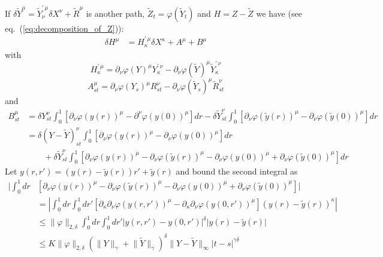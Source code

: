 \documentclass[a4paper,12pt,reqno]{amsproc}
\newcommand{\der}{\delta\!}
\newcommand{\norm}[1]{\lVert #1\rVert}
\newcommand{\abs}[1]{\lvert #1\rvert}
\newcommand{\Abs}[1]{\left\lvert #1\right\rvert}
\begin{document}
If $\der\widetilde Y^\mu =  \widetilde Y^{\prime\,\mu}_{\nu}  \der X^\nu
+ \widetilde  R^\mu$ is another path, $\widetilde Z_t =
\varphi(\widetilde Y_t)$ and $H = Z -\widetilde Z$ we have (see
eq.~(\ref{eq:decomposition_of_Z})):
\begin{equation}
\label{eq:difference_H}
  \begin{split}
\der H^\mu &  = H^{\prime\,\mu}_{\kappa} \der X^\kappa + A^\mu + B^\mu
  \end{split}
\end{equation}
with 
$$
H^{\prime\,\mu}_{\kappa} = \partial_\nu \varphi(Y)^\mu
Y^{\prime\,\nu}_{\kappa}-\partial_\nu \varphi(\widetilde Y)^\mu \widetilde Y^{\prime\,\nu}_{\kappa}
$$
$$
A^{\mu}_{st} = \partial_\nu\varphi(Y_s)^\mu R^\nu_{st} -
\partial_\nu\varphi(\widetilde  Y_s)^\mu \widetilde  R^\nu_{st}
$$
and
\begin{equation*}
  \begin{split}
B^{\mu}_{st} & =
 \der Y^\nu_{st} \int_0^1 \left[\partial_\nu
  \varphi(y(r))^\mu-\partial^\nu \varphi(y(0))^\mu\right] dr -
\der \widetilde Y^\nu_{st} \int_0^1 \left[\partial_\nu
  \varphi(\widetilde y(r))^\mu-\partial_\nu \varphi(\widetilde
  y(0))^\mu\right] dr 
\\ & = \der (Y-\widetilde Y)^\nu_{st} \int_0^1 \left[\partial_\nu
  \varphi(y(r))^\mu-\partial_\nu \varphi(y(0))^\mu\right] dr 
\\ & \qquad +
\der \widetilde Y^\nu_{st} \int_0^1 \left[
\partial_\nu\varphi(y(r))^\mu-\partial_\nu
  \varphi(\widetilde y(r))^\mu-\partial_\nu \varphi(y(0))^\mu+\partial_\nu \varphi(\widetilde
  y(0))^\mu\right] dr 
  \end{split}
\end{equation*}
Let $y(r,r') = (y(r) -  \widetilde  y(r)) r' + \widetilde y(r)$ and bound the
second integral as
\begin{equation*}
  \begin{split}
\Big|\int_0^1 dr & \left[
\partial_\nu\varphi(y(r))^\mu-\partial_\nu
  \varphi(\widetilde y(r))^\mu-\partial_\nu
  \varphi(y(0))^\mu+\partial_\nu \varphi(\widetilde y(0))^\mu\right] \Big|
\\ & =
\Abs{\int_0^1 dr \int_0^1 dr'  \left[
\partial_{\kappa} \partial_\nu\varphi(y(r,r'))^\mu-\partial_{\kappa} \partial_\nu \varphi(y(0,r'))^\mu\right] (y(r) -  \widetilde  y(r))^{\kappa} }
\\ & \le \|\varphi\|_{2,\delta}
{\int_0^1 dr \int_0^1 dr'  |y(r,r')-y(0,r')|^\delta } \abs{y(r) -  \widetilde  y(r) }
\\ & \le K \|\varphi\|_{2,\delta} (\norm{Y}_{\gamma}+\norm{\widetilde
  Y}_{\gamma})^{\delta} \norm{Y-\widetilde Y}_\infty |t-s|^{\gamma \delta}
  \end{split}
 \end{equation*}
\end{document}
